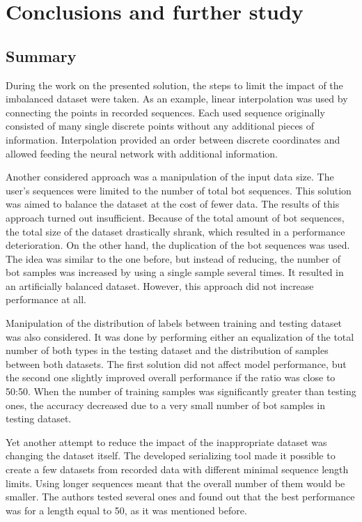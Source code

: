 \section{Conclusions and further study}\label{sec:conclusions-and-further-study}

\subsection{Summary}\label{subsec:summary}
During the work on the presented solution, the steps to limit the impact of the imbalanced dataset were taken.
As an example, linear interpolation was used by connecting the points in recorded sequences.
Each used sequence originally consisted of many single discrete points without any additional pieces of information.
Interpolation provided an order between discrete coordinates and allowed feeding the neural network with additional information.

Another considered approach was a manipulation of the input data size.
The user's sequences were limited to the number of total bot sequences.
This solution was aimed to balance the dataset at the cost of fewer data.
The results of this approach turned out insufficient.
Because of the total amount of bot sequences, the total size of the dataset drastically shrank, which resulted in a performance deterioration.
On the other hand, the duplication of the bot sequences was used.
The idea was similar to the one before, but instead of reducing, the number of bot samples was increased by using a single sample several times.
It resulted in an artificially balanced dataset.
However, this approach did not increase performance at all.

Manipulation of the distribution of labels between training and testing dataset was also considered.
It was done by performing either an equalization of the total number of both types in the testing dataset and the distribution of samples between both datasets.
The first solution did not affect model performance, but the second one slightly improved overall performance if the ratio was close to \num{50}:\num{50}.
When the number of training samples was significantly greater than testing ones, the accuracy decreased due to a very small number of bot samples in testing dataset.

Yet another attempt to reduce the impact of the inappropriate dataset was changing the dataset itself.
The developed serializing tool made it possible to create a few datasets from recorded data with different minimal sequence length limits.
Using longer sequences meant that the overall number of them would be smaller.
The authors tested several ones and found out that the best performance was for a length equal to \num{50}, as it was mentioned before.

